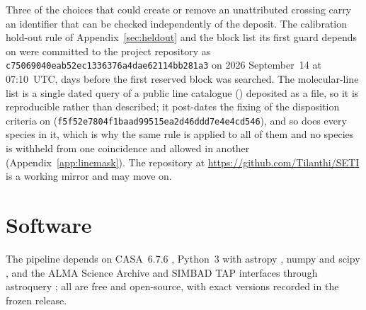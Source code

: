 Three of the choices that could create or remove an unattributed crossing
carry an identifier that can be checked independently of the deposit. The
calibration hold-out rule of Appendix~\ref{sec:heldout} and the block list
its first guard depends on were committed to the project repository as
\texttt{c75069040eab52ec1336376a4dae62114bb281a3} on 2026 September~14 at
07:10~UTC, \HoLeadBlockDays{} days before the first reserved block was
searched. The molecular-line list is a single dated query of a public line
catalogue (\McQueryDate) deposited as a file, so it is reproducible rather
than described; it post-dates the fixing of the disposition criteria on
\MkCritDate{} (\texttt{f5f52e7804f1baad99515ea2d46ddd7e4e4cd546}), and so
does every species in it, which is why the same rule is applied to all of
them and no species is withheld from one coincidence and allowed in another
(Appendix~\ref{app:linemask}). The repository at
\url{https://github.com/Tilanthi/SETI} is a working mirror and may move on.

\section*{Software}
The pipeline depends on CASA~6.7.6 \citep[casatools/casatasks
6.7.6-14;][]{CASA2022}, Python~3 with astropy \citep{Astropy2022}, numpy
\citep{Harris2020} and scipy \citep{Virtanen2020}, and the ALMA Science
Archive and SIMBAD TAP interfaces through astroquery \citep{Ginsburg2019};
all are free and open-source, with exact
versions recorded in the frozen release.
